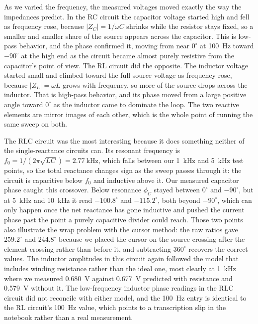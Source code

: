 \documentclass[11pt]{article}
\begin{document}
As we varied the frequency, the measured voltages moved exactly the way the
impedances predict. In the RC circuit the capacitor voltage started high and fell
as frequency rose, because $|Z_C| = 1/\omega C$ shrinks while the resistor stays
fixed, so a smaller and smaller share of the source appears across the capacitor.
This is low-pass behavior, and the phase confirmed it, moving from near $0^\circ$
at \SI{100}{\hertz} toward $-90^\circ$ at the high end as the circuit became
almost purely resistive from the capacitor's point of view. The RL circuit did
the opposite. The inductor voltage started small and climbed toward the full
source voltage as frequency rose, because $|Z_L| = \omega L$ grows with
frequency, so more of the source drops across the inductor. That is high-pass
behavior, and its phase moved from a large positive angle toward $0^\circ$ as the
inductor came to dominate the loop. The two reactive elements are mirror images
of each other, which is the whole point of running the same sweep on both.

The RLC circuit was the most interesting because it does something neither of the
single-reactance circuits can. Its resonant frequency is
$f_0 = 1/(2\pi\sqrt{LC}) = \SI{2.77}{\kilo\hertz}$, which falls between our
\SI{1}{\kilo\hertz} and \SI{5}{\kilo\hertz} test points, so the total reactance
changes sign as the sweep passes through it: the circuit is capacitive below
$f_0$ and inductive above it. Our measured capacitor phase caught this crossover.
Below resonance $\phi_C$ stayed between $0^\circ$ and $-90^\circ$, but at
\SI{5}{\kilo\hertz} and \SI{10}{\kilo\hertz} it read $-100.8^\circ$ and
$-115.2^\circ$, both beyond $-90^\circ$, which can only happen once the net
reactance has gone inductive and pushed the current phase past the point a purely
capacitive divider could reach. Those two points also illustrate the wrap problem
with the cursor method: the raw ratios gave $259.2^\circ$ and $244.8^\circ$
because we placed the cursor on the source crossing after the element crossing
rather than before it, and subtracting $360^\circ$ recovers the correct values.
The inductor amplitudes in this circuit again followed the model that includes
winding resistance rather than the ideal one, most clearly at \SI{1}{\kilo\hertz}
where we measured \SI{0.680}{\volt} against \SI{0.677}{\volt} predicted with
resistance and \SI{0.579}{\volt} without it. The low-frequency inductor phase
readings in the RLC circuit did not reconcile with either model, and the
\SI{100}{\hertz} entry is identical to the RL circuit's \SI{100}{\hertz} value,
which points to a transcription slip in the notebook rather than a real
measurement.
\end{document}
